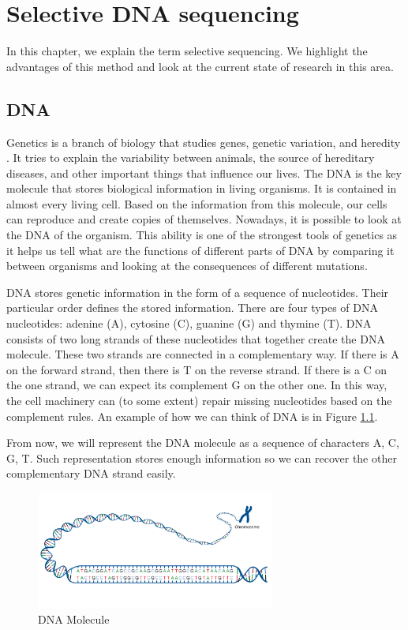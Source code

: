 \chapter{Selective DNA sequencing}
\label{kap:selSeq}

In this chapter, we explain the term selective sequencing. We highlight the
advantages of this method and look at the current state of research in this area.

\section{DNA}

Genetics is a branch of biology that studies genes, genetic variation, and heredity \cite{genetics:2020}.
It tries to explain the variability between animals, the source of hereditary diseases, and
other important things that influence our lives. The DNA is the key molecule
that stores biological information in living organisms. It is contained in
almost every living cell. Based on the information from this molecule, our cells can reproduce and create copies of
themselves. Nowadays, it is possible to look at the DNA of the organism. This ability is
one of the strongest tools of genetics as it helps us tell what are the functions
of different parts of DNA by comparing it between organisms and looking at the
consequences of different mutations.

DNA stores genetic information in the form of a sequence of nucleotides. Their particular order defines the stored
information. There are four types of DNA nucleotides:
adenine (A), cytosine (C), guanine (G) and thymine (T). DNA consists of two long
strands of these nucleotides that together create the DNA molecule. These two strands
are connected in a complementary way. If there is A on the forward strand,
then there is T on the reverse strand. If there is a C on the one strand, we can expect
its complement G on the other one. In this way, the cell machinery can (to some extent) repair
missing nucleotides based on the complement rules. An example of how we can think
of DNA is in Figure \ref{obr:acgt}.

From now, we will represent the DNA molecule as a sequence of characters A, C, G, T.
Such representation stores enough information so we can recover the other complementary
DNA strand easily.

\begin{figure}
\centerline{\includegraphics[width=0.7\textwidth, height=0.3\textheight]{images/acgt}}
\caption[DNA]{DNA Molecule \cite{acgt:2020}}
\label{obr:acgt}
\end{figure}

